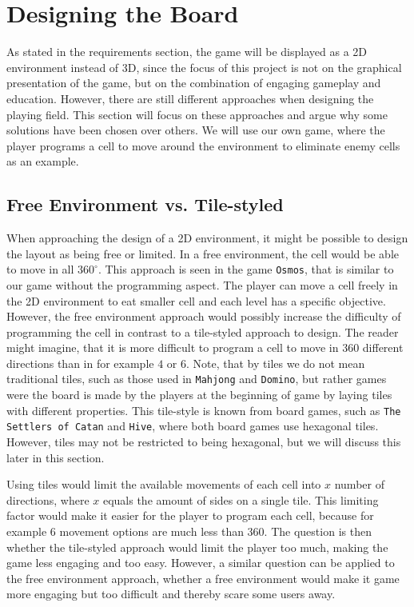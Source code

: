 \section{Designing the Board}
\label{sec:designing_playing_field}

As stated in the requirements section, the game will be displayed as a 2D environment instead of 3D, since the focus of this project is not on the graphical presentation of the game, but on the combination of engaging gameplay and education.
However, there are still different approaches when designing the playing field.
This section will focus on these approaches and argue why some solutions have been chosen over others.
We will use our own game, where the player programs a cell to move around the environment to eliminate enemy cells as an example.

\subsection{Free Environment vs. Tile-styled}
When approaching the design of a 2D environment, it might be possible to design the layout as being free or limited.
In a free environment, the cell would be able to move in all $360^{\circ}$.
This approach is seen in the game \texttt{Osmos}, that is similar to our game without the programming aspect.
The player can move a cell freely in the 2D environment to eat smaller cell and each level has a specific objective.
However, the free environment approach would possibly increase the difficulty of programming the cell in contrast to a tile-styled approach to design.
The reader might imagine, that it is more difficult to program a cell to move in $360$ different directions than in for example $4$ or $6$.
Note, that by tiles we do not mean traditional tiles, such as those used in \texttt{Mahjong} and \texttt{Domino}, but rather games were the board is made by the players at the beginning of game by laying tiles with different properties.
This tile-style is known from board games, such as \texttt{The Settlers of Catan} and \texttt{Hive}, where both board games use hexagonal tiles.
However, tiles may not be restricted to being hexagonal, but we will discuss this later in this section.\newline

Using tiles would limit the available movements of each cell into $x$ number of directions, where $x$ equals the amount of sides on a single tile.
This limiting factor would make it easier for the player to program each cell, because for example $6$ movement options are much less than $360$.
The question is then whether the tile-styled approach would limit the player too much, making the game less engaging and too easy.
However, a similar question can be applied to the free environment approach, whether a free environment would make it game more engaging but too difficult and thereby scare some users away.\newline

